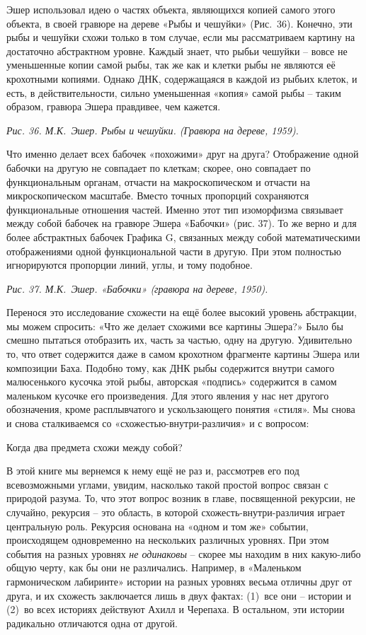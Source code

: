 \documentclass[../main.tex]{subfiles}
\begin{document}
Эшер использовал идею о частях объекта, являющихся копией самого этого объекта, в своей гравюре на дереве «Рыбы и чешуйки» (Рис.~36). Конечно, эти рыбы и чешуйки схожи только в том случае, если мы рассматриваем картину на достаточно абстрактном уровне. Каждый знает, что рыбьи чешуйки \--- вовсе не уменьшенные копии самой рыбы, так же как и клетки рыбы не являются её крохотными копиями. Однако ДНК, содержащаяся в каждой из рыбьих клеток, и есть, в действительности, сильно уменьшенная «копия» самой рыбы \--- таким образом, гравюра Эшера правдивее, чем кажется.

\emph{Рис. 36. М.К.~Эшер. Рыбы и чешуйки. (Гравюра на дереве, 1959).}

Что именно делает всех бабочек «похожими» друг на друга? Отображение одной бабочки на другую не совпадает по клеткам; скорее, оно совпадает по функциональным органам, отчасти на макроскопическом и отчасти на микроскопическом масштабе. Вместо точных пропорций сохраняются функциональные отношения частей. Именно этот тип изоморфизма связывает между собой бабочек на гравюре Эшера «Бабочки» (рис. 37). То же верно и для более абстрактных бабочек Графика G, связанных между собой математическими отображениями одной функциональной части в другую. При этом полностью игнорируются пропорции линий, углы, и тому подобное.

\emph{Рис. 37. М.К.~Эшер. «Бабочки» (гравюра на дереве, 1950).}

Перенося это исследование схожести на ещё более высокий уровень абстракции, мы можем спросить: «Что же делает схожими все картины Эшера?» Было бы смешно пытаться отобразить их, часть за частью, одну на другую. Удивительно то, что ответ содержится даже в самом крохотном фрагменте картины Эшера или композиции Баха. Подобно тому, как ДНК рыбы содержится внутри самого малюсенького кусочка этой рыбы, авторская «подпись» содержится в самом маленьком кусочке его произведения. Для этого явления у нас нет другого обозначения, кроме расплывчатого и ускользающего понятия «стиля». Мы снова и снова сталкиваемся со «схожестью-внутри-различия» и с вопросом:

Когда два предмета схожи между собой?

В этой книге мы вернемся к нему ещё не раз и, рассмотрев его под всевозможными углами, увидим, насколько такой простой вопрос связан с природой разума. То, что этот вопрос возник в главе, посвященной рекурсии, не случайно, рекурсия \--- это область, в которой схожесть-внутри-различия играет центральную роль. Рекурсия основана на «одном и том же» событии, происходящем одновременно на нескольких различных уровнях. При этом события на разных уровнях \emph{не одинаковы} \--- скорее мы находим в них какую-либо общую черту, как бы они не различались. Например, в «Маленьком гармоническом лабиринте» истории на разных уровнях весьма отличны друг от друга, и их схожесть заключается лишь в двух фактах: (1)~все они \--- истории и (2)~во всех историях действуют Ахилл и Черепаха. В остальном, эти истории радикально отличаются одна от другой.
\end{document}
